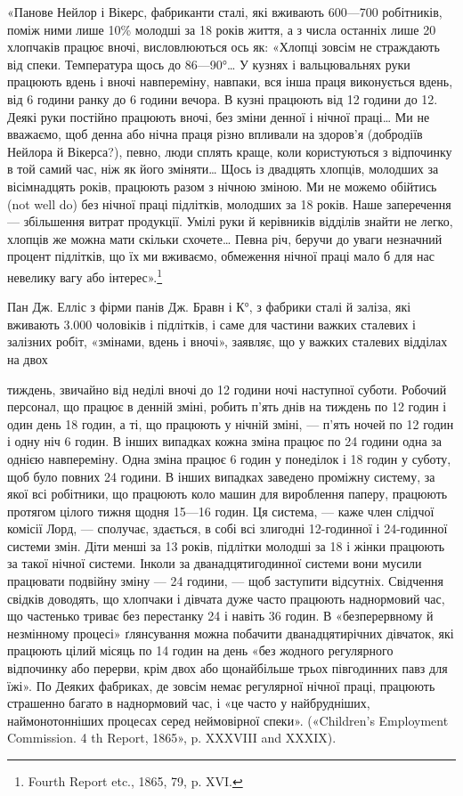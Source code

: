 «Панове Нейлор і Вікерс, фабриканти сталі, які вживають
600—700 робітників, поміж ними лише 10\% молодші за 18 років
життя, а з числа останніх лише 20 хлопчаків працює вночі,
висловлюються ось як: «Хлопці зовсім не страждають від спеки.
Температура щось до 86—90°\dots{} У кузнях і вальцювальнях
руки працюють вдень і вночі навпереміну, навпаки, вся інша
праця виконується вдень, від 6 години ранку до 6 години вечора.
В кузні працюють від 12 години до 12. Деякі руки постійно працюють
вночі, без зміни денної і нічної праці\dots{} Ми не вважаємо,
щоб денна або нічна праця різно впливали на здоров’я (добродіїв
Нейлора й Вікерса?), певно, люди сплять краще, коли користуються
з відпочинку в той самий час, ніж як його зміняти\dots{}
Щось із двадцять хлопців, молодших за вісімнадцять років,
працюють разом з нічною зміною. Ми не можемо обійтись (not
well do) без нічної праці підлітків, молодших за 18 років. Наше
заперечення — збільшення витрат продукції. Умілі руки й
керівників відділів знайти не легко, хлопців же можна мати
скільки схочете\dots{} Певна річ, беручи до уваги незначний процент
підлітків, що їх ми вживаємо, обмеження нічної праці мало б
для нас невелику вагу або інтерес».\footnote{
Fourth Report etc., 1865, 79, p. XVI.
}

Пан Дж. Елліс з фірми панів Дж. Бравн і К°, з фабрики
сталі й заліза, які вживають 3.000 чоловіків і підлітків,
і саме для частини важких сталевих і залізних робіт, «змінами,
вдень і вночі», заявляє, що у важких сталевих відділах на двох

тиждень, звичайно від неділі вночі до 12 години ночі наступної суботи.
Робочий персонал, що працює в денній зміні, робить п’ять днів на тиждень
по 12 годин і один день 18 годин, а ті, що працюють у нічній зміні, — п’ять
ночей по 12 годин і одну ніч 6 годин. В інших випадках кожна зміна працює
по 24 години одна за однією навпереміну. Одна зміна працює 6 годин у
понеділок і 18 годин у суботу, щоб було повних 24 години. В інших випадках
заведено проміжну систему, за якої всі робітники, що працюють
коло машин для вироблення паперу, працюють протягом цілого тижня
щодня 15—16 годин. Ця система, — каже член слідчої комісії Лорд, —
сполучає, здається, в собі всі злигодні 12-годинної і 24-годинної системи
змін. Діти менші за 13 років, підлітки молодші за 18 і жінки працюють
за такої нічної системи. Інколи за дванадцятигодинної системи вони
мусили працювати подвійну зміну — 24 години, — щоб заступити відсутніх.
Свідчення свідків доводять, що хлопчаки і дівчата дуже часто працюють
наднормовий час, що частенько триває без перестанку 24 і навіть 36 годин.
В «безперервному й незмінному процесі» ґлянсування можна побачити
дванадцятирічних дівчаток, які працюють цілий місяць по 14 годин на
день «без жодного регулярного відпочинку або перерви, крім двох або
щонайбільше трьох півгодинних павз для їжі». По Деяких фабриках, де
зовсім немає регулярної нічної праці, працюють страшенно багато в наднормовий
час, і «це часто у найбрудніших, наймонотонніших процесах
серед неймовірної спеки». («Children’s Employment Commission. 4 th
Report, 1865», p. XXXVIII and XXXIX).
\parbreak{}  %
